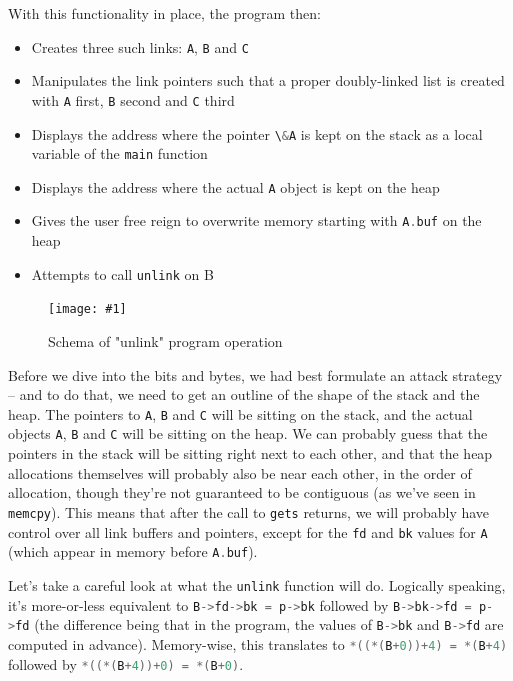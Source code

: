 \documentclass{article}
\newcommand{\displayimagecaphere}[2] {
    \begin{figure}[H]
    \centering
    \texttt{[image: \#1]} 
    \caption{#2}
\end{figure}
}
\newcommand{\xcode}[2]{\colorbox{ubuntuback}{\lstinline[language=#1]|#2|}}
\begin{document}
With this functionality in place, the program then:

\begin{itemize}
    \item Creates three such links: \xcode{C}{A}, \xcode{C}{B} and \xcode{C}{C} 
    \item Manipulates the link pointers such that a proper doubly-linked list is created with \xcode{C}{A} first, \xcode{C}{B} second and \xcode{C}{C} third
    \item Displays the address where the pointer \xcode{C}{\&A} is kept on the stack as a local variable of the \xcode{C}{main} function
    \item Displays the address where the actual \xcode{C}{A} object is kept on the heap
    \item Gives the user free reign to overwrite memory starting with \xcode{C}{A.buf} on the heap
    \item Attempts to call \xcode{C}{unlink} on B
\end{itemize}

\displayimagecaphere{../18_unlink/semantic_diagram.png}{Schema of "unlink" program operation}

Before we dive into the bits and bytes, we had best formulate an attack strategy -- and to do that, we need to get an outline of the shape of the stack and the heap. The pointers to \xcode{C}{A}, \xcode{C}{B} and \xcode{C}{C} will be sitting on the stack, and the actual objects \xcode{C}{A}, \xcode{C}{B} and \xcode{C}{C} will be sitting on the heap. We can probably guess that the pointers in the stack will be sitting right next to each other, and that the heap allocations themselves will probably also be near each other, in the order of allocation, though they're not guaranteed to be contiguous (as we've seen in \xcode{C}{memcpy}). This means that after the call to \xcode{C}{gets} returns, we will probably have control over all link buffers and pointers, except for the \xcode{C}{fd} and \xcode{C}{bk} values for \xcode{C}{A} (which appear in memory before \xcode{C}{A.buf}).

Let's take a careful look at what the \xcode{C}{unlink} function will do. Logically speaking, it's more-or-less equivalent to \xcode{C}{B->fd->bk = p->bk} followed by \xcode{C}{B->bk->fd = p->fd} (the difference being that in the program, the values of \xcode{C}{B->bk} and \xcode{C}{B->fd} are computed in advance). Memory-wise, this translates to \xcode{C}{*((*(B+0))+4) = *(B+4)} followed by \xcode{C}{*((*(B+4))+0) = *(B+0)}. 
\end{document}
